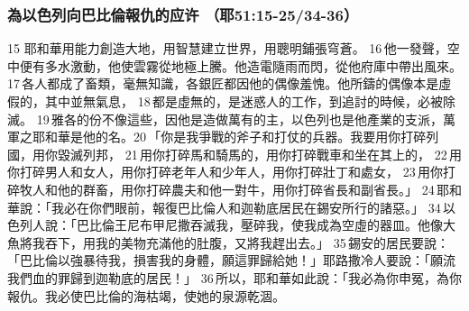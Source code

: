 \subsubsection{為以色列向巴比倫報仇的应许 （耶51:15-25/34-36）}
15 耶和華用能力創造大地，用智慧建立世界，用聰明鋪張穹蒼。 16 他一發聲，空中便有多水激動，他使雲霧從地極上騰。他造電隨雨而閃，從他府庫中帶出風來。 17 各人都成了畜類，毫無知識，各銀匠都因他的偶像羞愧。他所鑄的偶像本是虛假的，其中並無氣息， 18 都是虛無的，是迷惑人的工作，到追討的時候，必被除滅。 19 雅各的份不像這些，因他是造做萬有的主，以色列也是他產業的支派，萬軍之耶和華是他的名。20 「你是我爭戰的斧子和打仗的兵器。我要用你打碎列國，用你毀滅列邦， 21 用你打碎馬和騎馬的，用你打碎戰車和坐在其上的， 22 用你打碎男人和女人，用你打碎老年人和少年人，用你打碎壯丁和處女， 23 用你打碎牧人和他的群畜，用你打碎農夫和他一對牛，用你打碎省長和副省長。」 24 耶和華說：「我必在你們眼前，報復巴比倫人和迦勒底居民在錫安所行的諸惡。」
34 以色列人說：「巴比倫王尼布甲尼撒吞滅我，壓碎我，使我成為空虛的器皿。他像大魚將我吞下，用我的美物充滿他的肚腹，又將我趕出去。」 35 錫安的居民要說：「巴比倫以強暴待我，損害我的身體，願這罪歸給她！」耶路撒冷人要說：「願流我們血的罪歸到迦勒底的居民！」 36 所以，耶和華如此說：「我必為你申冤，為你報仇。我必使巴比倫的海枯竭，使她的泉源乾涸。
